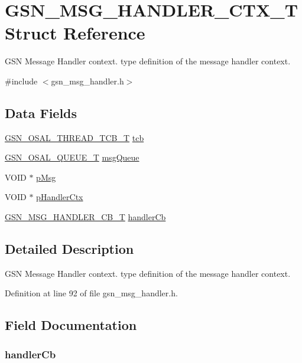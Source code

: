 \hypertarget{a00155}{
\section{GSN\_\-MSG\_\-HANDLER\_\-CTX\_\-T Struct Reference}
\label{a00155}
}


GSN Message Handler context. type definition of the message handler context.  




{\ttfamily \#include $<$gsn\_\-msg\_\-handler.h$>$}

\subsection*{Data Fields}
\begin{DoxyCompactItemize}
\item 
\hyperlink{a00628_ga43c1eefe78fa26e478301976f96ac31f}{GSN\_\-OSAL\_\-THREAD\_\-TCB\_\-T} \hyperlink{a00155_afe071d7dcf0fdfb6314fefc4b6f663df}{tcb}
\item 
\hyperlink{a00628_gaebe1c924d01bf6607bd65961bf134095}{GSN\_\-OSAL\_\-QUEUE\_\-T} \hyperlink{a00155_a3525baeed8d9f795ed0c44437f548da2}{msgQueue}
\item 
VOID $\ast$ \hyperlink{a00155_a115621dd56e7c469fd9324a45ae055c0}{pMsg}
\item 
VOID $\ast$ \hyperlink{a00155_a5d6d9da64bf90f43d0fb33529eefb8b4}{pHandlerCtx}
\item 
\hyperlink{a00627_ga638c4ec452bde3b70fae3b7239e05cca}{GSN\_\-MSG\_\-HANDLER\_\-CB\_\-T} \hyperlink{a00155_a087d559888142d52ed61a64bb5f01f6b}{handlerCb}
\end{DoxyCompactItemize}


\subsection{Detailed Description}
GSN Message Handler context. type definition of the message handler context. 

Definition at line 92 of file gsn\_\-msg\_\-handler.h.



\subsection{Field Documentation}
\hypertarget{a00155_a087d559888142d52ed61a64bb5f01f6b}{
\subsubsection[{handlerCb}]{ {\bf handlerCb}}}
\label{a00155_a087d559888142d52ed61a64bb5f01f6b}


